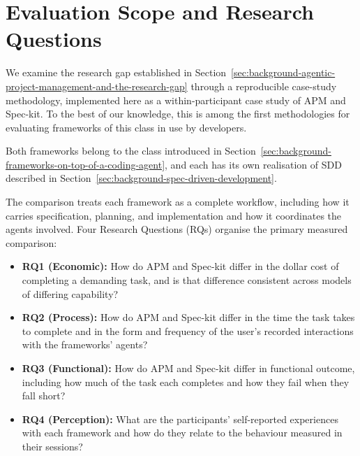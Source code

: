 
\section{Evaluation Scope and Research Questions}
\label{sec:evaluation-scope}

We examine the research gap established in Section~\ref{sec:background-agentic-project-management-and-the-research-gap} through a reproducible case-study methodology, implemented here as a within-participant case study of APM and Spec-kit. To the best of our knowledge, this is among the first methodologies for evaluating frameworks of this class in use by developers.

Both frameworks belong to the class introduced in Section~\ref{sec:background-frameworks-on-top-of-a-coding-agent}, and each has its own realisation of SDD described in Section~\ref{sec:background-spec-driven-development}.

The comparison treats each framework as a complete workflow, including how it carries specification, planning, and implementation and how it coordinates the agents involved. Four Research Questions (RQs) organise the primary measured comparison:

\begin{itemize}
    \item \textbf{RQ1 (Economic):} How do APM and Spec-kit differ in the dollar cost of completing a demanding task, and is that difference consistent across models of differing capability?
    \item \textbf{RQ2 (Process):} How do APM and Spec-kit differ in the time the task takes to complete and in the form and frequency of the user's recorded interactions with the frameworks' agents?
    \item \textbf{RQ3 (Functional):} How do APM and Spec-kit differ in functional outcome, including how much of the task each completes and how they fail when they fall short?
    \item \textbf{RQ4 (Perception):} What are the participants' self-reported experiences with each framework and how do they relate to the behaviour measured in their sessions?
\end{itemize}

